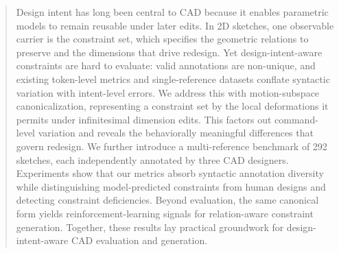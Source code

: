 \begin{abstract}
Design intent has long been central to CAD because it enables parametric models to remain reusable under later edits. In 2D sketches, one observable carrier is the constraint set, which specifies the geometric relations to preserve and the dimensions that drive redesign. Yet design-intent-aware constraints are hard to evaluate: valid annotations are non-unique, and existing token-level metrics and single-reference datasets conflate syntactic variation with intent-level errors. We address this with motion-subspace canonicalization, representing a constraint set by the local deformations it permits under infinitesimal dimension edits. This factors out command-level variation and reveals the behaviorally meaningful differences that govern redesign. We further introduce a multi-reference benchmark of 292 sketches, each independently annotated by three CAD designers. Experiments show that our metrics absorb syntactic annotation diversity while distinguishing model-predicted constraints from human designs and detecting constraint deficiencies. Beyond evaluation, the same canonical form yields reinforcement-learning signals for relation-aware constraint generation. Together, these results lay practical groundwork for design-intent-aware CAD evaluation and generation.
\end{abstract}
